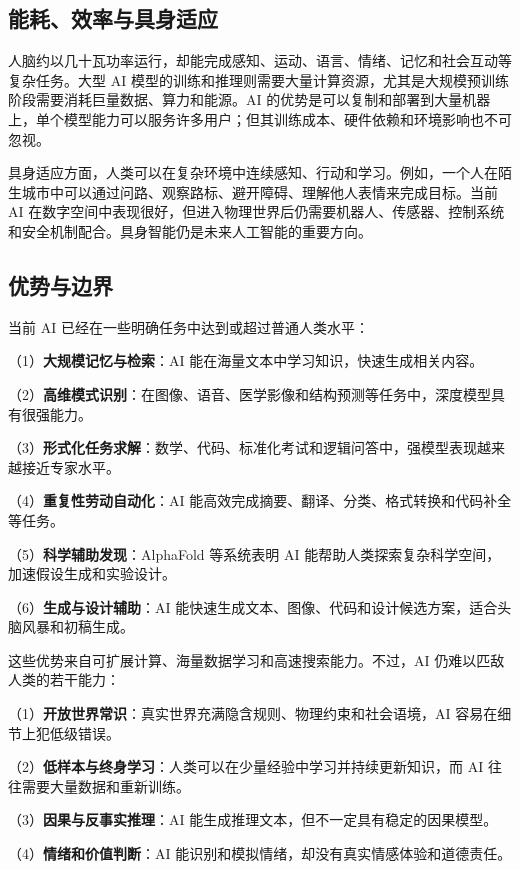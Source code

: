 \documentclass[UTF8,zihao=5,a4paper]{ctexart}
\begin{document}
\subsection{能耗、效率与具身适应}

人脑约以几十瓦功率运行，却能完成感知、运动、语言、情绪、记忆和社会互动等复杂任务。大型 AI 模型的训练和推理则需要大量计算资源，尤其是大规模预训练阶段需要消耗巨量数据、算力和能源。AI 的优势是可以复制和部署到大量机器上，单个模型能力可以服务许多用户；但其训练成本、硬件依赖和环境影响也不可忽视。

具身适应方面，人类可以在复杂环境中连续感知、行动和学习。例如，一个人在陌生城市中可以通过问路、观察路标、避开障碍、理解他人表情来完成目标。当前 AI 在数字空间中表现很好，但进入物理世界后仍需要机器人、传感器、控制系统和安全机制配合。具身智能仍是未来人工智能的重要方向。

\subsection{优势与边界}

当前 AI 已经在一些明确任务中达到或超过普通人类水平：

（1）\textbf{大规模记忆与检索}：AI 能在海量文本中学习知识，快速生成相关内容。

（2）\textbf{高维模式识别}：在图像、语音、医学影像和结构预测等任务中，深度模型具有很强能力。

（3）\textbf{形式化任务求解}：数学、代码、标准化考试和逻辑问答中，强模型表现越来越接近专家水平。

（4）\textbf{重复性劳动自动化}：AI 能高效完成摘要、翻译、分类、格式转换和代码补全等任务。

（5）\textbf{科学辅助发现}：AlphaFold 等系统表明 AI 能帮助人类探索复杂科学空间，加速假设生成和实验设计。

（6）\textbf{生成与设计辅助}：AI 能快速生成文本、图像、代码和设计候选方案，适合头脑风暴和初稿生成。

这些优势来自可扩展计算、海量数据学习和高速搜索能力。不过，AI 仍难以匹敌人类的若干能力：

（1）\textbf{开放世界常识}：真实世界充满隐含规则、物理约束和社会语境，AI 容易在细节上犯低级错误。

（2）\textbf{低样本与终身学习}：人类可以在少量经验中学习并持续更新知识，而 AI 往往需要大量数据和重新训练。

（3）\textbf{因果与反事实推理}：AI 能生成推理文本，但不一定具有稳定的因果模型。

（4）\textbf{情绪和价值判断}：AI 能识别和模拟情绪，却没有真实情感体验和道德责任。
\end{document}
